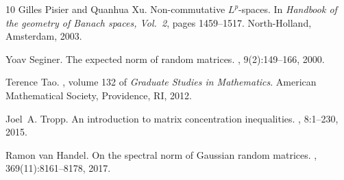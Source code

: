 \documentclass[10pt,reqno]{amsart}
\theoremstyle{definition}
\numberwithin{equation}{section}
\numberwithin{figure}{section}
\numberwithin{table}{section}
\begin{document}
\begin{thebibliography}{10}
Gilles Pisier and Quanhua Xu.
\newblock Non-commutative {$L^p$}-spaces.
\newblock In {\em Handbook of the geometry of {B}anach spaces, {V}ol.\ 2},
  pages 1459--1517. North-Holland, Amsterdam, 2003.

Yoav Seginer.
\newblock The expected norm of random matrices.
, 9(2):149--166, 2000.

Terence Tao.
, volume 132 of {\em Graduate
  Studies in Mathematics}.
\newblock American Mathematical Society, Providence, RI, 2012.

Joel~A. Tropp.
\newblock An introduction to matrix concentration inequalities.
, 8:1--230, 2015.

Ramon van Handel.
\newblock On the spectral norm of {G}aussian random matrices.
, 369(11):8161--8178, 2017.

\end{thebibliography}
\end{document}
